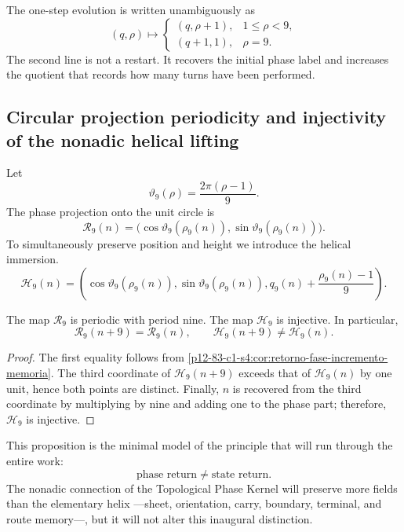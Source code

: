 The one-step evolution is written unambiguously as
\[
 (q,\rho)\longmapsto
 \begin{cases}
 (q,\rho+1),&1\leq\rho<9,\\
 (q+1,1),&\rho=9.
 \end{cases}
\]
The second line is not a restart. It recovers the initial phase label and
increases the quotient that records how many turns have been performed.

\subsection{Circular projection periodicity and injectivity of the nonadic helical lifting}

Let
\[
 \vartheta_9(\rho)=\frac{2\pi(\rho-1)}9.
\]
The phase projection onto the unit circle is
\[
 \mathcal R_9(n)=
 \bigl(\cos\vartheta_9(\rho_9(n)),
       \sin\vartheta_9(\rho_9(n))\bigr).
\]
To simultaneously preserve position and height we introduce the helical immersion.
\[
 \mathcal H_9(n)=
 \left(
  \cos\vartheta_9(\rho_9(n)),
  \sin\vartheta_9(\rho_9(n)),
  q_9(n)+\frac{\rho_9(n)-1}{9}
 \right).
\]

\begin{proposition}
\label{p12-83-c1-s4:prop:rueda-no-determina-estado}
The map \(\mathcal R_9\) is periodic with period nine. The map
\(\mathcal H_9\) is injective. In particular,
\[
 \mathcal R_9(n+9)=\mathcal R_9(n),
 \qquad
 \mathcal H_9(n+9)\neq\mathcal H_9(n).
\]
\end{proposition}

\begin{proof}
The first equality follows from
\cref{p12-83-c1-s4:cor:retorno-fase-incremento-memoria}. The third coordinate of
\(\mathcal H_9(n+9)\) exceeds that of \(\mathcal H_9(n)\) by one unit, hence
both points are distinct. Finally, \(n\) is recovered from the third coordinate
by multiplying by nine and adding one to the phase part;
therefore, \(\mathcal H_9\) is injective.
\end{proof}

This proposition is the minimal model of the principle that will run through the entire
work:
\[
 \boxed{\text{phase return}\neq\text{state return}.}
\]
The nonadic connection of the Topological Phase Kernel will preserve more fields than
the elementary helix ---sheet, orientation, carry, boundary, terminal, and
route memory---, but it will not alter this inaugural distinction.

